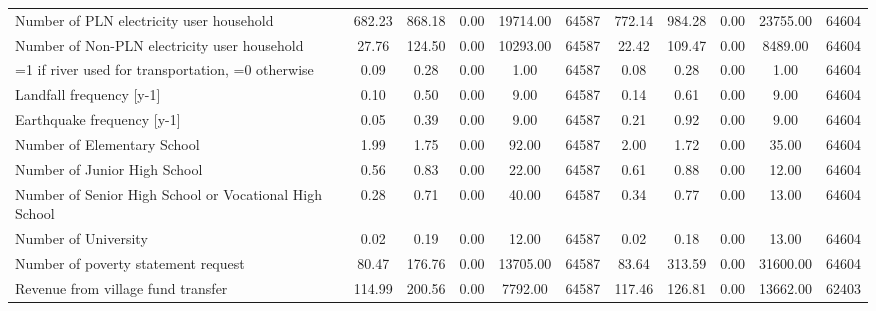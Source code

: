 \begin{tabular}{l*{2}{ccccc}}
Number of PLN electricity user household&   682.23&   868.18&     0.00& 19714.00&    64587&   772.14&   984.28&     0.00& 23755.00&    64604\\
Number of Non-PLN electricity user household&    27.76&   124.50&     0.00& 10293.00&    64587&    22.42&   109.47&     0.00&  8489.00&    64604\\
=1 if river used for transportation, =0 otherwise&     0.09&     0.28&     0.00&     1.00&    64587&     0.08&     0.28&     0.00&     1.00&    64604\\
Landfall frequency [y-1]&     0.10&     0.50&     0.00&     9.00&    64587&     0.14&     0.61&     0.00&     9.00&    64604\\
Earthquake frequency [y-1]&     0.05&     0.39&     0.00&     9.00&    64587&     0.21&     0.92&     0.00&     9.00&    64604\\
Number of Elementary School&     1.99&     1.75&     0.00&    92.00&    64587&     2.00&     1.72&     0.00&    35.00&    64604\\
Number of Junior High School&     0.56&     0.83&     0.00&    22.00&    64587&     0.61&     0.88&     0.00&    12.00&    64604\\
Number of Senior High School or Vocational High School&     0.28&     0.71&     0.00&    40.00&    64587&     0.34&     0.77&     0.00&    13.00&    64604\\
Number of University&     0.02&     0.19&     0.00&    12.00&    64587&     0.02&     0.18&     0.00&    13.00&    64604\\
Number of poverty statement request&    80.47&   176.76&     0.00& 13705.00&    64587&    83.64&   313.59&     0.00& 31600.00&    64604\\
Revenue from village fund transfer&   114.99&   200.56&     0.00&  7792.00&    64587&   117.46&   126.81&     0.00& 13662.00&    62403\\
\bottomrule
\end{tabular}
